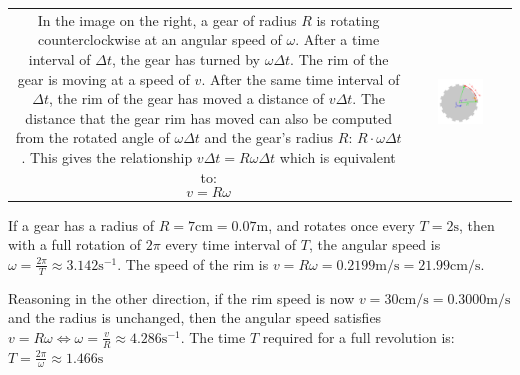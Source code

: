 \documentclass{article}
\begin{document}
\begin{tabular}{cc}
\parbox{0.5\textwidth}{
In the image on the right, a gear of radius \(R\) is rotating counterclockwise at an angular speed of \(\omega\). After a time interval of \(\Delta t\), the gear has turned by \(\omega \Delta t\). The rim of the gear is moving at a speed of \(v\). After the same time interval of \(\Delta t\), the rim of the gear has moved a distance of \(v\Delta t\). The distance that the gear rim has moved can also be computed from the rotated angle of \(\omega \Delta t\) and the gear's radius \(R\): \(R \cdot \omega \Delta t\). This gives the relationship \(v \Delta t = R \omega \Delta t\) which is equivalent to:
\[v = R \omega\]
} & \parbox{0.5\textwidth}{
\includegraphics[width = 0.5\textwidth]{spinning_gear}
}
\end{tabular}

If a gear has a radius of \(R = 7\text{cm} = 0.07\text{m}\), and rotates once every \(T = 2\text{s}\), then with a full rotation of \(2\pi\) every time interval of \(T\), the angular speed is \(\omega = \frac{2\pi}{T} \approx 3.142 \text{s}^{-1}\). The speed of the rim is \(v = R\omega = 0.2199\text{m/s} = 21.99\text{cm/s}\).

Reasoning in the other direction, if the rim speed is now \(v = 30\text{cm/s} = 0.3000 \text{m/s}\) and the radius is unchanged, then the angular speed satisfies \(v = R\omega \iff \omega = \frac{v}{R} \approx 4.286 \text{s}^{-1}\). The time \(T\) required for a full revolution is: \(T = \frac{2\pi}{\omega} \approx 1.466 \text{s}\)
\end{document}
